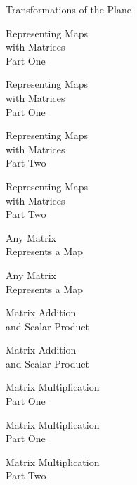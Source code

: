 \documentclass{titlescreen}
\begin{document}
%
\begin{videotitle}
  Transformations of the Plane 
\end{videotitle}
\begin{videoend}
  Representing Maps  \\[0.5ex]
  with Matrices  \\[1ex]
  Part One
\end{videoend}

\begin{videotitle}
  Representing Maps  \\[0.5ex]
  with Matrices  \\[1ex]
  Part One
\end{videotitle}
\begin{videoend}
  Representing Maps  \\[0.5ex]
  with Matrices  \\[1ex]
  Part Two
\end{videoend}

%
\begin{videotitle}
  Representing Maps  \\[0.5ex]
  with Matrices  \\[1ex]
  Part Two
\end{videotitle}
\begin{videoend}
  Any Matrix \\[0.5ex]
  Represents a Map
\end{videoend}

%
\begin{videotitle}
  Any Matrix \\[0.5ex]
  Represents a Map
\end{videotitle}
\begin{videoend}
  Matrix Addition  \\[0.5ex]
  and Scalar Product 
\end{videoend}

\begin{videotitle}
  Matrix Addition  \\[0.5ex]
  and Scalar Product 
\end{videotitle}
\begin{videoend}
  Matrix Multiplication  \\[1ex]
  Part One
\end{videoend}

\begin{videotitle}
  Matrix Multiplication  \\[1ex]
  Part One
\end{videotitle}
\begin{videoend}
  Matrix Multiplication  \\[1ex]
  Part Two
\end{videoend}
\end{document}
